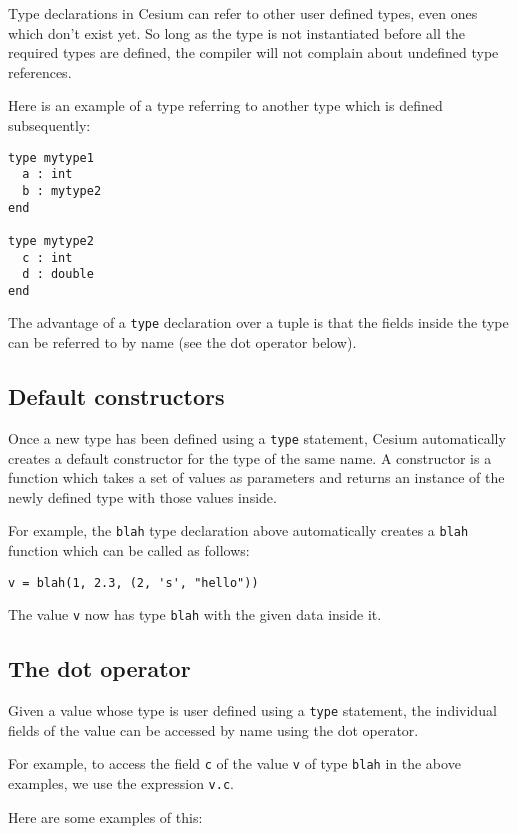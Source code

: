 \documentclass[a4paper,10pt]{article}
\newcommand{\code}{\lstinline}
\begin{document}
{Type declarations in Cesium can refer to other user defined types, even ones which don't exist 
yet. So long as the type is not instantiated before all the required types are defined, the compiler
will not complain about undefined type references.

Here is an example of a type referring to another type which is defined subsequently:

\begin{lstlisting}
type mytype1
  a : int
  b : mytype2
end

type mytype2
  c : int
  d : double
end
\end{lstlisting}

The advantage of a \code{type} declaration over a tuple is that the fields inside the type
can be referred to by name (see the dot operator below). 

\subsection{Default constructors}

Once a new type has been defined using a \code{type} statement, Cesium automatically creates a
default constructor for the type of the same name. A constructor is a function which takes a set of 
values as parameters and returns an instance of the newly defined type with those values inside.

For example, the \code{blah} type declaration above automatically creates a \code{blah} function
which can be called as follows:

\begin{lstlisting}
v = blah(1, 2.3, (2, 's', "hello"))
\end{lstlisting}

The value \code{v} now has type \code{blah} with the given data inside it.

\subsection{The dot operator}

Given a value whose type is user defined using a \code{type} statement, the individual fields of
the value can be accessed by name using the dot operator.

For example, to access the field \code{c} of the value \code{v} of type \code{blah} in the above
examples, we use the expression \code{v.c}.

Here are some examples of this:

}
\end{document}
